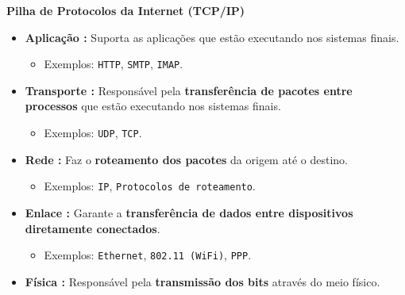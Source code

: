         \textbf{Pilha de Protocolos da Internet (TCP/IP)}
            \begin{itemize}[left=0.5cm, align=left, nosep]   
                
                \item \textbf{Aplicação :} Suporta as aplicações que estão executando nos sistemas finais.
                \begin{itemize}[left=0.5cm, nosep, label=$\hookrightarrow$]
                    \item Exemplos: \texttt{HTTP}, \texttt{SMTP}, \texttt{IMAP}.
                \end{itemize}
                
                \item \textbf{Transporte :} Responsável pela \textbf{transferência de pacotes entre processos} que estão executando nos sistemas finais.
                \begin{itemize}[left=0.5cm, nosep, label=$\hookrightarrow$]
                    \item Exemplos: \texttt{UDP}, \texttt{TCP}.
                \end{itemize}
                
                \item \textbf{Rede :} Faz o \textbf{roteamento dos pacotes} da origem até o destino.
                \begin{itemize}[left=0.5cm, nosep, label=$\hookrightarrow$]
                    \item Exemplos: \texttt{IP}, \texttt{Protocolos de roteamento}.
                \end{itemize}

                \item \textbf{Enlace :} Garante a \textbf{transferência de dados entre dispositivos diretamente conectados}.
                \begin{itemize}[left=0.5cm, nosep, label=$\hookrightarrow$]
                    \item Exemplos: \texttt{Ethernet}, \texttt{802.11 (WiFi)}, \texttt{PPP}.
                \end{itemize}
            
                \item \textbf{Física :} Responsável pela \textbf{transmissão dos bits} através do meio físico. 
            
            \end{itemize} 

